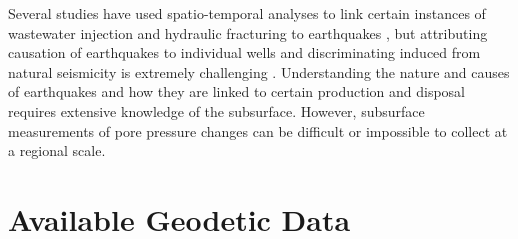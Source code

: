 
Several studies have used spatio-temporal analyses to link certain instances of wastewater injection and hydraulic fracturing to earthquakes \citep{Savvaidis2020InducedSeismicityDelaware, Skoumal2020InducedSeismicityDelaware, Grigoratos2020EarthquakesInducedWastewatera}, but attributing causation of earthquakes to individual wells and discriminating induced from natural seismicity is extremely challenging \citep{Grigoli2017CurrentChallengesMonitoring, Dahm2012RecommendationDiscriminationHuman, Verdon2019ImprovedFrameworkDiscriminating,Frohlich2016HistoricalReviewInduced, Frohlich2016ReplyCommentA}.
Understanding the nature and causes of earthquakes and how they are linked to certain production and disposal requires extensive knowledge of the subsurface.
However, subsurface measurements of pore pressure changes can be difficult or impossible to collect at a regional scale.


\section{Available Geodetic Data}
%



